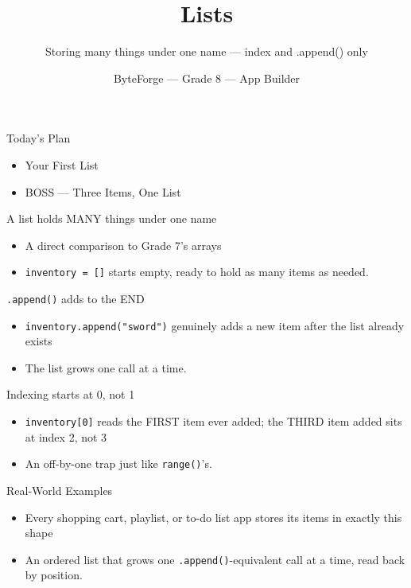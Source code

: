 \documentclass[aspectratio=169]{beamer}
\title{Lists}
\subtitle{Storing many things under one name — index and .append() only}
\author{ByteForge --- Grade 8 --- App Builder}
\date{}
\begin{document}
\begin{frame}
    \titlepage
\end{frame}

\begin{frame}{Today's Plan}
    \begin{itemize}
        \item Your First List
        \item[$\bigstar$] BOSS --- Three Items, One List
    \end{itemize}
\end{frame}

\begin{frame}{A list holds MANY things under one name}
    \large
    \begin{itemize}
        \item A direct comparison to Grade 7's arrays
        \item \texttt{inventory = []} starts empty, ready to hold as many items as needed.
    \end{itemize}
\end{frame}


\begin{frame}{\texttt{.append()} adds to the END}
    \large
    \begin{itemize}
        \item \texttt{inventory.append("sword")} genuinely adds a new item after the list already exists
        \item The list grows one call at a time.
    \end{itemize}
\end{frame}


\begin{frame}{Indexing starts at 0, not 1}
    \large
    \begin{itemize}
        \item \texttt{inventory[0]} reads the FIRST item ever added; the THIRD item added sits at index 2, not 3
        \item An off-by-one trap just like \texttt{range()}'s.
    \end{itemize}
\end{frame}

\begin{frame}{Real-World Examples}
    \large
    \begin{itemize}
        \item Every shopping cart, playlist, or to-do list app stores its items in exactly this shape
        \item An ordered list that grows one \texttt{.append()}-equivalent call at a time, read back by position.
    \end{itemize}
\end{frame}
\end{document}
